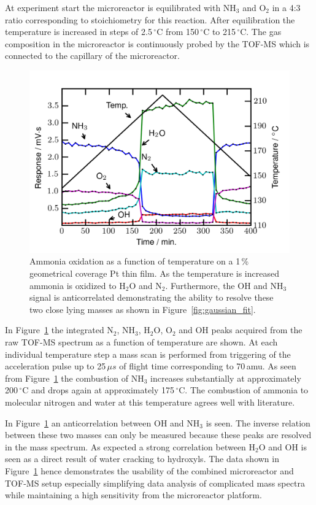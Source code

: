 \documentclass[aip,rsi]{revtex4-1}
\begin{document}
At experiment start the microreactor is equilibrated with NH$_3$ and O$_2$ in a 4:3 ratio corresponding to stoichiometry for this reaction. After equilibration the temperature is increased in steps of 2.5\,$^{\circ}$C from 150\,$^{\circ}$C to 215\,$^{\circ}$C. The gas composition in the microreactor is continuously probed by the TOF-MS which is connected to the capillary of the microreactor.
\begin{figure}
 \includegraphics[width=14cm]{ammonia_reactivity.png}%
 \caption{Ammonia oxidation as a function of temperature on a 1\,\% geometrical coverage Pt thin film. As the temperature is increased ammonia is oxidized to H$_2$O and N$_2$. Furthermore, the OH and NH$_3$ signal is anticorrelated demonstrating the ability to resolve these two close lying masses as shown in Figure~\ref{fig:gaussian_fit}.\label{fig:ammonia_reactivity}}%
\end{figure}
In Figure~\ref{fig:ammonia_reactivity} the integrated N$_2$, NH$_3$, H$_2$O, O$_2$ and OH peaks acquired from the raw TOF-MS spectrum as a function of temperature are shown. At each individual temperature step a mass scan is performed from triggering of the acceleration pulse up to 25\,$\mu s$ of flight time corresponding to 70\,amu. As seen from Figure~\ref{fig:ammonia_reactivity} the combustion of NH$_3$ increases substantially at approximately 200\,$^{\circ}$C and drops again at approximately 175\,$^{\circ}$C. The combustion of ammonia to molecular nitrogen and water at this temperature agrees well with literature\cite{Imbihl2007,Zeng2009}. 

In Figure~\ref{fig:ammonia_reactivity} an anticorrelation between OH and NH$_3$ is seen. The inverse relation between these two masses can only be measured because these peaks are resolved in the mass spectrum. As expected a strong correlation between H$_2$O and OH is seen as a direct result of water cracking to hydroxyls. The data shown in Figure~\ref{fig:ammonia_reactivity} hence demonstrates the usability of the combined microreactor and TOF-MS setup especially simplifying data analysis of complicated mass spectra while maintaining a high sensitivity from the microreactor platform.
\end{document}
